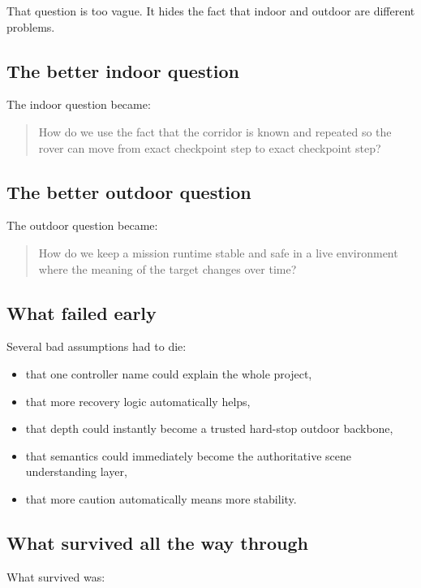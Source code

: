 \documentclass[11pt]{article}
\begin{document}
That question is too vague. It hides the fact that indoor and outdoor are
different problems.

\subsection{The better indoor question}

The indoor question became:

\begin{quote}
How do we use the fact that the corridor is known and repeated so the rover can
move from exact checkpoint step to exact checkpoint step?
\end{quote}

\subsection{The better outdoor question}

The outdoor question became:

\begin{quote}
How do we keep a mission runtime stable and safe in a live environment where the
meaning of the target changes over time?
\end{quote}

\subsection{What failed early}

Several bad assumptions had to die:

\begin{itemize}[nosep]
  \item that one controller name could explain the whole project,
  \item that more recovery logic automatically helps,
  \item that depth could instantly become a trusted hard-stop outdoor backbone,
  \item that semantics could immediately become the authoritative scene
  understanding layer,
  \item that more caution automatically means more stability.
\end{itemize}

\subsection{What survived all the way through}

What survived was:
\end{document}
